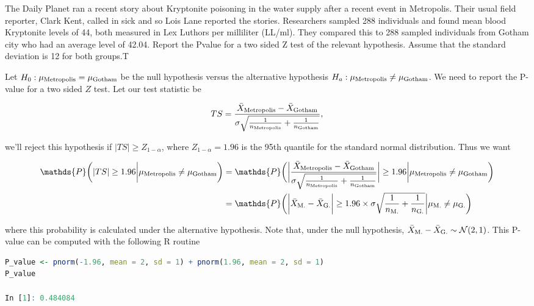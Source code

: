 \documentclass{homework}
\begin{document}
\begin{tcolorbox}[title=Question 9]
The Daily Planet ran a recent story about Kryptonite poisoning in the water supply after a recent event in Metropolis. Their usual field reporter, Clark Kent, called in sick and so Lois Lane reported the stories. Researchers sampled 288 individuals and found mean blood Kryptonite levels of 44, both measured in Lex Luthors per milliliter (LL/ml). They compared this to 288 sampled individuals from Gotham city who had an average level of 42.04. Report the Pvalue for a two sided Z test of the relevant hypothesis. Assume that the standard deviation is 12 for both groups.T
\end{tcolorbox}

Let $H_0 : \mu_{\textnormal{Metropolis}} = \mu_{\textnormal{Gotham}}$ be the null hypothesis versus the alternative hypothesis $H_a : \mu_{\textnormal{Metropolis}} \neq \mu_{\textnormal{Gotham}}$. We need to report the P-value for a two sided $Z$ test. Let our test statistic be

$$
TS = \frac{\bar{X}_{\textnormal{Metropolis}} - \bar{X}_{\textnormal{Gotham}} }{\sigma\sqrt{\frac{1}{n_{\textnormal{Metropolis}}} + \frac{1}{n_{\textnormal{Gotham}}}}},
$$

we'll reject this hypothesis if $|TS| \geq Z_{1-\alpha}$, where $Z_{1-\alpha} = 1.96$ is the 95th quantile for the standard normal distribution. Thus we want

\begin{align*}
\mathds{P}\bigg(|TS| \geq 1.96 \bigg| \mu_{\textnormal{Metropolis}} \neq \mu_{\textnormal{Gotham}} \bigg) &= \mathds{P}\bigg(\bigg|\frac{\bar{X}_{\textnormal{Metropolis}} - \bar{X}_{\textnormal{Gotham}} }{\sigma\sqrt{\frac{1}{n_{\textnormal{Metropolis}}} + \frac{1}{n_{\textnormal{Gotham}}}}}\bigg| \geq 1.96 \bigg| \mu_{\textnormal{Metropolis}} \neq \mu_{\textnormal{Gotham}}\bigg) \\
&= \mathds{P}\bigg(\bigg|\bar{X}_{\textnormal{M.}} - \bar{X}_{\textnormal{G.}}\bigg| \geq 1.96 \times \sigma\sqrt{\frac{1}{n_{\textnormal{M.}}} + \frac{1}{n_{\textnormal{G.}}}} \bigg| \mu_{\textnormal{M.}} \neq \mu_{\textnormal{G.}}\bigg)
\end{align*}

where this probability is calculated under the alternative hypothesis. Note that, under the null hypothesis, $\bar{X}_{\textnormal{M.}} - \bar{X}_{\textnormal{G.}} \sim \mathcal{N}(2,1)$. This P-value can be computed with the following R routine

\begin{lstlisting}[language=R]
P_value <- pnorm(-1.96, mean = 2, sd = 1) + pnorm(1.96, mean = 2, sd = 1)
P_value 

In [1]: 0.484084
\end{lstlisting}
\end{document}

